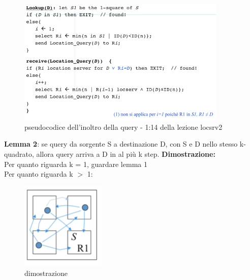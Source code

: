 \documentclass[12pt,italian]{report}
\begin{document}
\begin{figure}[h]
\centering
\includegraphics[width=100mm]{img/pseudocoddiffqu.PNG}
\caption{pseudocodice dell'inoltro della query - 1:14 della lezione locsrv2}
\label{fig:pseudo}
\end{figure}
\bigbreak
\noindent \textbf{Lemma 2}: se query da sorgente S a destinazione D, con S e D nello stesso k-quadrato, allora query arriva a D in al più k step.
\bigbreak
\noindent \textbf{Dimostrazione:} \\
Per quanto riguarda k = 1, guardare lemma 1 \\
Per quanto riguarda k $>$ 1: \\
\begin{figure}[h]
\centering
\includegraphics[width=40mm]{img/dimlemma2.PNG}
\caption{dimostrazione}
\label{fig:ferf}
\end{figure}
\bigbreak
\end{document}
